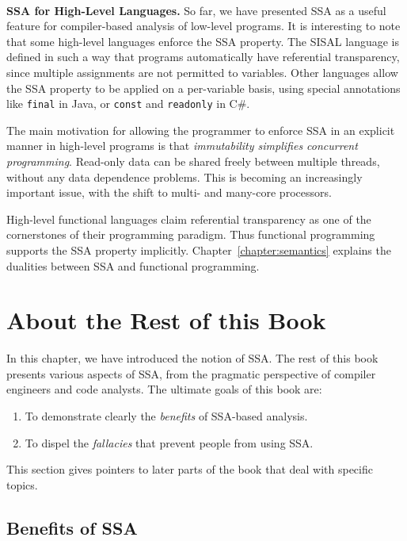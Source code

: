 ~\\ \textbf{SSA for High-Level Languages.} 
So far, we have presented SSA as a useful feature for compiler-based analysis of low-level programs. 
It is interesting to note that some high-level languages enforce the SSA property. 
The SISAL language is defined in such a way that programs automatically have referential transparency, since multiple assignments are not permitted to variables. 
Other languages allow the SSA property to be applied on a per-variable basis, using special annotations like \texttt{final} in Java, or \texttt{const} and \texttt{readonly} in C\#.

The main motivation for allowing the programmer to enforce SSA in an explicit manner in high-level programs is that \textit{immutability simplifies concurrent programming}. 
Read-only data can be shared freely between multiple threads, without any data dependence problems. 
This is becoming an increasingly important issue, with the shift to multi- and many-core processors.

High-level functional languages claim referential transparency as one of the cornerstones of their programming paradigm. 
Thus functional programming supports the SSA property implicitly. 
Chapter~\ref{chapter:semantics} explains the dualities between SSA and functional programming.



\section{About the Rest of this Book}

In this chapter, we have introduced the notion of SSA. 
The rest of this book presents various aspects of SSA, from the pragmatic perspective of compiler engineers and code analysts. 
The ultimate goals of this book are:
\begin{enumerate}
\item To demonstrate clearly the \emph{benefits} of SSA-based analysis.
\item To dispel the \emph{fallacies} that prevent people from using SSA.
\end{enumerate}
This section gives pointers to later parts of the book that deal with specific topics.


\subsection{Benefits of SSA}
\vspace{-1mm}

